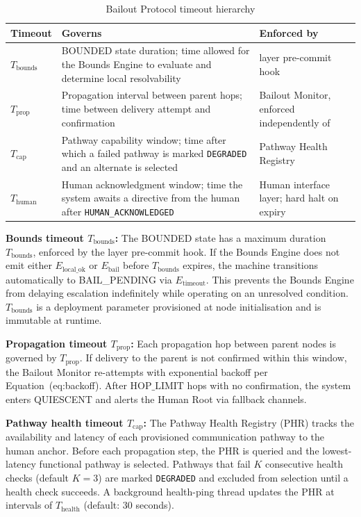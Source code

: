 \bigskip
\begin{table}[htbp]
\centering
\caption{Bailout Protocol timeout hierarchy}
\label{tab:bailout-timeouts}
\bigskip
\begin{tabular}{@{}lp{5cm}p{5cm}@{}}
\toprule
\textbf{Timeout} & \textbf{Governs} & \textbf{Enforced by} \\
\midrule
$T_{\text{bounds}}$ & BOUNDED state duration; time allowed for the
  Bounds Engine to evaluate and determine local resolvability &
  \fact{} layer pre-commit hook \\
$T_{\text{prop}}$ & Propagation interval between parent hops;
  time between delivery attempt and confirmation &
  Bailout Monitor, enforced independently of \bounds{} \\
$T_{\text{cap}}$ & Pathway capability window; time after which a
  failed pathway is marked \texttt{DEGRADED} and an alternate is selected &
  Pathway Health Registry \\
$T_{\text{human}}$ & Human acknowledgment window; time the system awaits
  a directive from the human after \texttt{HUMAN\_ACKNOWLEDGED} &
  Human interface layer; hard halt on expiry \\
\midrule
\end{tabular}
\end{table}

\bigskip
\noindent\textbf{Bounds timeout $T_{\text{bounds}}$:} The BOUNDED state
has a maximum duration $T_{\text{bounds}}$, enforced by the \fact{} layer
pre-commit hook. If the Bounds Engine does not emit either
$E_{\text{local\_ok}}$ or $E_{\text{bail}}$ before $T_{\text{bounds}}$
expires, the machine transitions automatically to BAIL\_PENDING via
$E_{\text{timeout}}$. This prevents the Bounds Engine from delaying
escalation indefinitely while operating on an unresolved condition.
$T_{\text{bounds}}$ is a deployment parameter provisioned at node
initialisation and is immutable at runtime.

\bigskip
\noindent\textbf{Propagation timeout $T_{\text{prop}}$:} Each propagation
hop between parent nodes is governed by $T_{\text{prop}}$. If delivery to
the parent is not confirmed within this window, the Bailout Monitor
re-attempts with exponential backoff per Equation~(eq:backoff). After
$\text{HOP\_LIMIT}$ hops with no confirmation, the system enters
QUIESCENT and alerts the Human Root via fallback channels.

\bigskip
\noindent\textbf{Pathway health timeout $T_{\text{cap}}$:} The Pathway
Health Registry (PHR) tracks the availability and latency of each
provisioned communication pathway to the human anchor. Before each
propagation step, the PHR is queried and the lowest-latency functional
pathway is selected. Pathways that fail $K$ consecutive health checks
(default $K = 3$) are marked \texttt{DEGRADED} and excluded from
selection until a health check succeeds. A background health-ping thread
updates the PHR at intervals of $T_{\text{health}}$ (default: 30 seconds).


